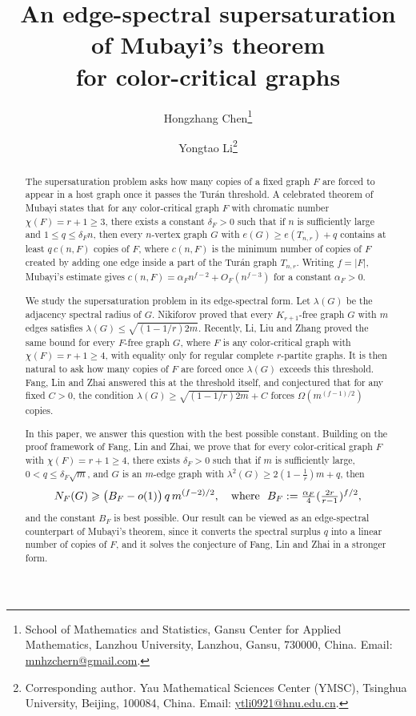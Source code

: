 \documentclass[11pt,a4paper]{article}
\title{An edge-spectral supersaturation of Mubayi's theorem\\ for color-critical graphs}
\author{Hongzhang Chen\thanks{School of Mathematics and Statistics, Gansu Center for Applied Mathematics, Lanzhou University, Lanzhou, Gansu, 730000, China. Email: \url{mnhzchern@gmail.com}.} 
\and Yongtao Li\thanks{Corresponding author. 
Yau Mathematical Sciences Center (YMSC), Tsinghua University, Beijing, 100084, China. Email: \url{ytli0921@hnu.edu.cn}.} 
}
\date{}
\theoremstyle{definition}
\theoremstyle{plain}
\renewcommand{\le}{\leqslant}
\renewcommand{\ge}{\geqslant}
\begin{document}
\maketitle


\vspace{-7mm}
\begin{abstract}
The supersaturation problem asks how many copies of a fixed graph $F$ are forced to appear in a host graph once it passes the Tur\'an threshold.  
A celebrated theorem of Mubayi states that for any color-critical graph $F$ with chromatic number $\chi (F)=r+1\ge 3$, there exists a constant $\delta_F >0$ such that if $n$ is sufficiently large and $1\le q \le \delta_F n$, then every $n$-vertex graph $G$ with $e(G)\ge e(T_{n,r}) +q$ contains at least $q\, c(n,F)$ copies of $F$, 
where $c(n,F)$ is the minimum number of copies of $F$ 
created by adding one edge inside a part of the Tur\'an graph $T_{n,r}$. 
Writing $f=|F|$, Mubayi's estimate gives $c(n,F)=\alpha_F n^{f-2}+O_F(n^{f-3})$ for a
constant $\alpha_F>0$. 

We study the supersaturation problem in its edge-spectral form. Let $\lambda(G)$ be the adjacency spectral radius of $G$. Nikiforov proved that every $K_{r+1}$-free graph $G$ with $m$ edges satisfies $\lambda (G)\le \sqrt{(1\!-\!1/r )2m}$. Recently, 
 Li, Liu and Zhang proved the same bound for every $F$-free graph $G$, where $F$ is any color-critical graph with $\chi(F)=r+1\ge4$, with equality only for regular complete $r$-partite graphs. It is then natural to ask how many copies of
$F$ are forced once $\lambda (G)$ exceeds this threshold. Fang, Lin and Zhai answered
this at the threshold itself, and conjectured that for any fixed $C>0$, the condition $\lambda (G)\ge \sqrt{(1\!-\!{1}/{r})2m} +C$  forces $\Omega\!\left(m^{(f-1)/2}\right)$ copies. 

In this paper, we answer this question with the best possible constant. 
Building on the proof framework of Fang, Lin and Zhai, 
we prove that for every
color-critical graph $F$ with $\chi(F)=r+1\ge4$, there exists $\delta_F>0$ such that if $m$
is sufficiently large, $0<q\le\delta_F\sqrt m$, and $G$ is an $m$-edge graph with
$\lambda^2(G)\ge 2\left(1-\tfrac1r\right)m+q$, then
\vspace{-2mm}
\[
  N_F(G)\ge\bigl(B_F-o(1)\bigr)\,q\,
  m^{{(f-2)}/{2}},
  \quad \text{where}~~
  B_F:=\tfrac{\alpha_F}{4}
   (\tfrac{2r}{r-1} )^{{f}/{2}}, \vspace{-1mm} 
\] 
and the constant $B_F$ is best possible. 
Our result can be viewed as an edge-spectral counterpart of Mubayi's theorem, 
since it converts the spectral surplus $q$ into a linear number of copies of $F$, and it solves the conjecture of Fang, Lin and Zhai in a stronger form. 
\end{abstract}
\end{document}
